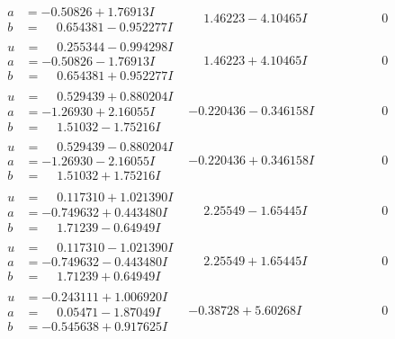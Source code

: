\documentclass[1p]{elsarticle_modified}
\theoremstyle{definition}
\begin{document}
$$\begin{array}{c|c|c}
\begin{aligned}
a &= -0.50826 + 1.76913 I \\
b &= \phantom{-}0.654381 - 0.952277 I\end{aligned}
 & \phantom{-}1.46223 - 4.10465 I & \phantom{-0.000000 } 0 \\ \hline\begin{aligned}
u &= \phantom{-}0.255344 - 0.994298 I \\
a &= -0.50826 - 1.76913 I \\
b &= \phantom{-}0.654381 + 0.952277 I\end{aligned}
 & \phantom{-}1.46223 + 4.10465 I & \phantom{-0.000000 } 0 \\ \hline\begin{aligned}
u &= \phantom{-}0.529439 + 0.880204 I \\
a &= -1.26930 + 2.16055 I \\
b &= \phantom{-}1.51032 - 1.75216 I\end{aligned}
 & -0.220436 - 0.346158 I & \phantom{-0.000000 } 0 \\ \hline\begin{aligned}
u &= \phantom{-}0.529439 - 0.880204 I \\
a &= -1.26930 - 2.16055 I \\
b &= \phantom{-}1.51032 + 1.75216 I\end{aligned}
 & -0.220436 + 0.346158 I & \phantom{-0.000000 } 0 \\ \hline\begin{aligned}
u &= \phantom{-}0.117310 + 1.021390 I \\
a &= -0.749632 + 0.443480 I \\
b &= \phantom{-}1.71239 - 0.64949 I\end{aligned}
 & \phantom{-}2.25549 - 1.65445 I & \phantom{-0.000000 } 0 \\ \hline\begin{aligned}
u &= \phantom{-}0.117310 - 1.021390 I \\
a &= -0.749632 - 0.443480 I \\
b &= \phantom{-}1.71239 + 0.64949 I\end{aligned}
 & \phantom{-}2.25549 + 1.65445 I & \phantom{-0.000000 } 0 \\ \hline\begin{aligned}
u &= -0.243111 + 1.006920 I \\
a &= \phantom{-}0.05471 - 1.87049 I \\
b &= -0.545638 + 0.917625 I\end{aligned}
 & -0.38728 + 5.60268 I & \phantom{-0.000000 } 0 \\ \hline\begin{aligned}

\end{aligned}
\end{array}$$
\end{document}
